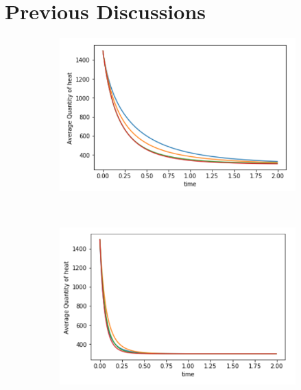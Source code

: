 \documentclass[10pt,a4paper]{article}
\begin{document}
\section{Previous Discussions}
\begin{figure}[!h]
	\centering
	\begin{subfigure}[b]{0.30\textwidth}
		\includegraphics[width=\textwidth]{images/quantity-time-exponents-x0.png}
	\end{subfigure}~
	\begin{subfigure}[b]{0.30\textwidth}
		\includegraphics[width= \textwidth]{images/quantity-time-exponents-x01.png}
	\end{subfigure}~
	\begin{subfigure}[b]{0.30\textwidth}

\end{subfigure}
\end{figure}
\end{document}
